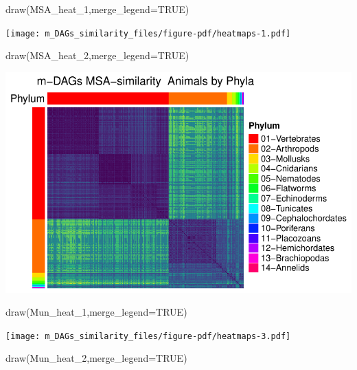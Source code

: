 \documentclass[
  letterpaper,
  DIV=11,
  numbers=noendperiod]{scrreprt}
\newenvironment{Shaded}{}{}
\newcommand{\AttributeTok}[1]{\textcolor[rgb]{0.78,0.47,0.87}{#1}}
\newcommand{\ConstantTok}[1]{\textcolor[rgb]{0.82,0.60,0.40}{#1}}
\newcommand{\FunctionTok}[1]{\textcolor[rgb]{0.38,0.69,0.94}{#1}}
\newcommand{\NormalTok}[1]{\textcolor[rgb]{0.67,0.70,0.75}{#1}}
\begin{document}
\begin{Shaded}
\begin{Highlighting}[]
\FunctionTok{draw}\NormalTok{(MSA\_heat\_1,}\AttributeTok{merge\_legend=}\ConstantTok{TRUE}\NormalTok{)}
\end{Highlighting}
\end{Shaded}

\texttt{[image: m\_DAGs\_similarity\_files/figure-pdf/heatmaps-1.pdf]}

\begin{Shaded}
\begin{Highlighting}[]
\FunctionTok{draw}\NormalTok{(MSA\_heat\_2,}\AttributeTok{merge\_legend=}\ConstantTok{TRUE}\NormalTok{)}
\end{Highlighting}
\end{Shaded}

\includegraphics[width=1\textwidth,height=\textheight]{m_DAGs_similarity_files/figure-pdf/heatmaps-2.pdf}

\begin{Shaded}
\begin{Highlighting}[]
\FunctionTok{draw}\NormalTok{(Mun\_heat\_1,}\AttributeTok{merge\_legend=}\ConstantTok{TRUE}\NormalTok{)}
\end{Highlighting}
\end{Shaded}

\texttt{[image: m\_DAGs\_similarity\_files/figure-pdf/heatmaps-3.pdf]}

\begin{Shaded}
\begin{Highlighting}[]
\FunctionTok{draw}\NormalTok{(Mun\_heat\_2,}\AttributeTok{merge\_legend=}\ConstantTok{TRUE}\NormalTok{)}
\end{Highlighting}
\end{Shaded}
\end{document}

